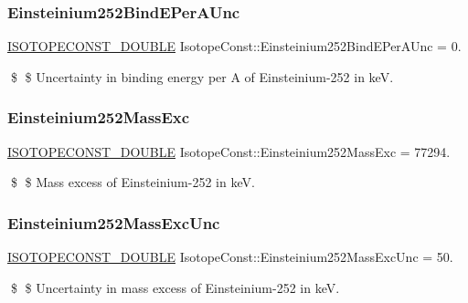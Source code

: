 \subsubsection{\texorpdfstring{Einsteinium252\+Bind\+E\+Per\+A\+Unc}{Einsteinium252BindEPerAUnc}}
{\footnotesize\ttfamily \mbox{\hyperlink{group___isotope_const-_macros_ga8f45a7272ce02c0b4c65c44636ed719a}{I\+S\+O\+T\+O\+P\+E\+C\+O\+N\+S\+T\+\_\+\+D\+O\+U\+B\+LE}} Isotope\+Const\+::\+Einsteinium252\+Bind\+E\+Per\+A\+Unc = 0.}

\$ \$ Uncertainty in binding energy per A of Einsteinium-\/252 in keV. \mbox{\label{group___isotope_const-_einsteinium-_es252_ga0657b78cc66d5c60add731eb8c3cd8ad}} 
\subsubsection{\texorpdfstring{Einsteinium252\+Mass\+Exc}{Einsteinium252MassExc}}
{\footnotesize\ttfamily \mbox{\hyperlink{group___isotope_const-_macros_ga8f45a7272ce02c0b4c65c44636ed719a}{I\+S\+O\+T\+O\+P\+E\+C\+O\+N\+S\+T\+\_\+\+D\+O\+U\+B\+LE}} Isotope\+Const\+::\+Einsteinium252\+Mass\+Exc = 77294.}

\$ \$ Mass excess of Einsteinium-\/252 in keV. \mbox{\label{group___isotope_const-_einsteinium-_es252_ga655c671c92965cf8a185d2b0ef9afa28}} 
\subsubsection{\texorpdfstring{Einsteinium252\+Mass\+Exc\+Unc}{Einsteinium252MassExcUnc}}
{\footnotesize\ttfamily \mbox{\hyperlink{group___isotope_const-_macros_ga8f45a7272ce02c0b4c65c44636ed719a}{I\+S\+O\+T\+O\+P\+E\+C\+O\+N\+S\+T\+\_\+\+D\+O\+U\+B\+LE}} Isotope\+Const\+::\+Einsteinium252\+Mass\+Exc\+Unc = 50.}

\$ \$ Uncertainty in mass excess of Einsteinium-\/252 in keV. \mbox{\label{group___isotope_const-_einsteinium-_es252_ga1248a33fdf99615c4a743599a06a61d3}} 
